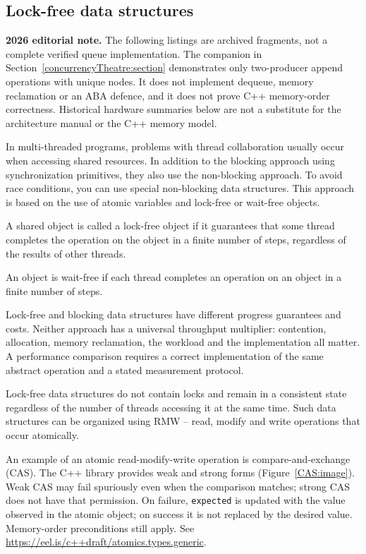 { %
	\subsection{Lock-free data structures}
	\label{lockfree:section}
	\par\textbf{2026 editorial note.} The following listings are archived fragments, not a complete verified queue implementation. The companion in Section~\ref{concurrencyTheatre:section} demonstrates only two-producer append operations with unique nodes. It does not implement dequeue, memory reclamation or an ABA defence, and it does not prove C++ memory-order correctness. Historical hardware summaries below are not a substitute for the architecture manual or the C++ memory model.
	\par In multi-threaded programs, problems with thread collaboration usually occur when accessing shared resources. In addition to the blocking approach using synchronization primitives, they also use the non-blocking approach. To avoid race conditions, you can use special non-blocking data structures. This approach is based on the use of atomic variables and lock-free or wait-free objects.
	\par A shared object is called a lock-free object if it guarantees that some thread completes the operation on the object in a finite number of steps, regardless of the results of other threads.
	\par An object is wait-free if each thread completes an operation on an object in a finite number of steps.
	\par Lock-free and blocking data structures have different progress guarantees and costs. Neither approach has a universal throughput multiplier: contention, allocation, memory reclamation, the workload and the implementation all matter. A performance comparison requires a correct implementation of the same abstract operation and a stated measurement protocol.
	\par Lock-free data structures do not contain locks and remain in a consistent state regardless of the number of threads accessing it at the same time. Such data structures can be organized using RMW -- read, modify and write operations that occur atomically.
	\par An example of an atomic read-modify-write operation is compare-and-exchange (CAS). The C++ library provides weak and strong forms (Figure~\ref{CAS:image}). Weak CAS may fail spuriously even when the comparison matches; strong CAS does not have that permission. On failure, \texttt{expected} is updated with the value observed in the atomic object; on success it is not replaced by the desired value. Memory-order preconditions still apply. See \url{https://eel.is/c++draft/atomics.types.generic}.
}
